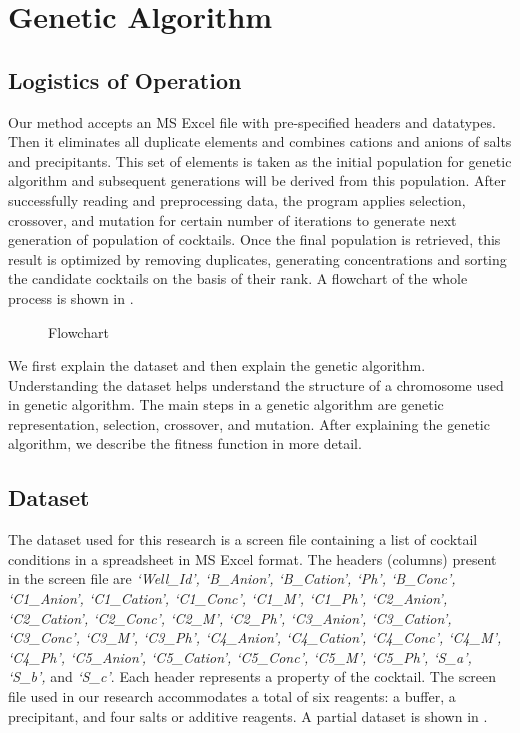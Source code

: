 \chapter{Genetic Algorithm}
\label{ch:background}




\section{Logistics of Operation} \label{sec:GA-logistics}
Our method accepts an MS Excel file with pre-specified headers and datatypes. Then it eliminates all duplicate elements and combines cations and anions of salts and precipitants. 
This set of elements is taken as the initial population for genetic algorithm and subsequent generations will be derived from this population. After successfully reading and preprocessing data, the program applies selection, crossover, and mutation for certain number of iterations to generate next generation of population of cocktails. Once the final population is retrieved, this result is optimized by removing duplicates, generating concentrations and sorting the candidate cocktails on the basis of their rank.
A flowchart of the whole process is shown in .


\begin{figure}[H]
	\caption{Flowchart}
	\label{fig:flow}
\end{figure}



We first explain the dataset and then explain the genetic algorithm. Understanding the dataset helps understand the structure of a chromosome used in genetic algorithm. The main steps in a genetic algorithm are genetic representation, selection, crossover, and mutation.
After explaining the genetic algorithm,  we describe the fitness function in more detail.


\section{Dataset} \label{sec:GA-dataset}

The dataset used for this research is a screen file containing a list of cocktail conditions in a spreadsheet in MS Excel format. The headers (columns) present in the screen file are \textit{`Well\_Id', `B\_Anion', `B\_Cation', `Ph', `B\_Conc', `C1\_Anion', `C1\_Cation', `C1\_Conc', `C1\_M', `C1\_Ph', `C2\_Anion', `C2\_Cation', `C2\_Conc', `C2\_M', `C2\_Ph', `C3\_Anion', `C3\_Cation', `C3\_Conc', `C3\_M', `C3\_Ph', `C4\_Anion', `C4\_Cation', `C4\_Conc', `C4\_M', `C4\_Ph', `C5\_Anion', `C5\_Cation', `C5\_Conc', `C5\_M', `C5\_Ph', `S\_a', `S\_b',} and \textit{`S\_c'}. Each header represents a property of the cocktail. The screen file used in our research accommodates a total of six reagents: a buffer, a precipitant, and four salts or additive reagents. A partial dataset is shown in .

